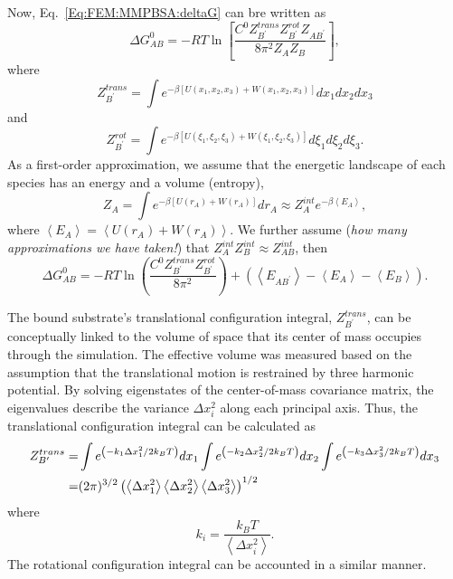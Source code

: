 Now, Eq.~\ref{Eq:FEM:MMPBSA:deltaG} can bre written as
\begin{equation}
   \Delta G_{AB}^0=-RT\ln{\left[\frac{C^0Z_{B^\prime}^{trans}Z_{B^\prime}^{rot}Z_{AB^\prime}}{8\pi^2Z_AZ_B}\right]},
\end{equation}
where
\begin{equation}
   Z_{B^\prime}^{trans}=\int e^{-\beta\left[U(x_1,x_2,x_3)+W(x_1,x_2,x_3)\right]}dx_1dx_2dx_3
\end{equation}
and
\begin{equation}
	Z_{B^\prime}^{rot}=\int e^{-\beta\left[U(\xi_1,\xi_2,\xi_3)+W(\xi_1,\xi_2,\xi_3)\right]}d\xi_1d\xi_2d\xi_3.
\end{equation}
As a first-order approximation, we assume that the energetic landscape of each species has an energy and a volume (entropy),
\begin{equation}
	Z_A=\int e^{-\beta \left[U(r_A)+W(r_A)\right]}dr_A\approx Z_A^{int}e^{-\beta \left<E_A\right>},
\end{equation}
where $\left<E_A\right>=\left<U(r_A)+W(r_A)\right>$. We further assume (\textit{how many approximations we have taken!}) that $Z_A^{int}Z_B^{int}\approx Z_{AB}^{int}$,
then
\begin{equation}
	\Delta G_{AB}^0=-RT\ln{\left(\frac{C^0Z_{B^\prime}^{trans}Z_{B^\prime}^{rot}}{8\pi^2}\right)} +\left(\left<E_{AB^\prime}\right>-\left<E_A\right>-\left<E_B\right>\right).
\end{equation}
 
The bound substrate's translational configuration integral, $Z_{B^\prime}^{trans}$, can be conceptually linked to the volume of space that its center of mass occupies through the simulation. The effective volume was measured based on the assumption that the translational motion is restrained by three harmonic potential. By solving eigenstates of the center-of-mass covariance matrix, the eigenvalues describe the variance $\Delta x_i^2$ along each principal axis. Thus, the translational configuration integral can be calculated as
\begin{align}
Z_{B^\prime}^{trans}=&\int e^{\left(-k_1\Delta x_1^2/2k_BT\right)}dx_1\int e^{\left(-k_2\Delta x_2^2/2k_BT\right)}dx_2\int e^{\left(-k_3\Delta x_3^2/2k_BT\right)}dx_3\notag\\
                    =&(2\pi)^{3/2}\left(\left<\Delta x_1^2\right>\left<\Delta x_2^2\right>\left<\Delta x_3^2\right>\right)^{1/2}
\end{align}
where
\begin{equation}
k_i=\frac{k_B T}{\left<\Delta x_i^2\right>}.
\end{equation}
The rotational configuration integral can be accounted in a similar manner.